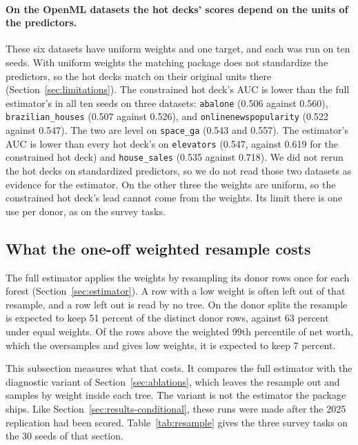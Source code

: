 \paragraph{On the OpenML datasets the hot decks' scores depend on the units
of the predictors.} These six datasets have uniform weights and one target,
and each was run on ten seeds. With uniform weights the matching package
does not standardize the predictors, so the hot decks match on their
original units there (Section~\ref{sec:limitations}). The constrained hot
deck's AUC is lower than the full estimator's in all ten seeds on three
datasets: \texttt{abalone} (0.506 against 0.560), \texttt{brazilian\_houses}
(0.507 against 0.526), and \texttt{onlinenewspopularity} (0.522 against
0.547). The two are level on \texttt{space\_ga} (0.543 and 0.557). The
estimator's AUC is lower than every hot deck's on \texttt{elevators} (0.547,
against 0.619 for the constrained hot deck) and \texttt{house\_sales} (0.535
against 0.718). We did not rerun the hot decks on standardized predictors,
so we do not read those two datasets as evidence for the estimator. On the
other three the weights are uniform, so the constrained hot deck's lead
cannot come from the weights. Its limit there is one use per donor, as on
the survey tasks.

\subsection{What the one-off weighted resample costs}
\label{sec:results-resample}

The full estimator applies the weights by resampling its donor rows once for
each forest (Section~\ref{sec:estimator}). A row with a low weight is often
left out of that resample, and a row left out is read by no tree. On the
\scf{} donor splits the resample is expected to keep 51 percent of the
distinct donor rows, against 63 percent under equal weights. Of the rows
above the weighted 99th percentile of net worth, which the \scf{} oversamples
and gives low weights, it is expected to keep 7 percent.

This subsection measures what that costs. It compares the full estimator
with the diagnostic variant of Section~\ref{sec:ablations}, which leaves the
resample out and samples by weight inside each tree. The variant is not the
estimator the package ships. Like Section~\ref{sec:results-conditional},
these runs were made after the 2025 replication had been scored.
Table~\ref{tab:resample} gives the three survey tasks on the 30 seeds of
that section.

